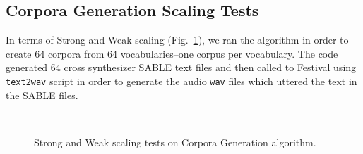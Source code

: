 {\subsection{Corpora Generation Scaling Tests}
\label{CG_Scaling_test}

In terms of Strong and Weak scaling (Fig.~\ref{fig:Corpora_Scaling}), we ran the algorithm in order to create 64 corpora from 64 vocabularies--one corpus per vocabulary. The code generated 64 cross synthesizer SABLE text files and then called to Festival using \texttt{text2wav} script in order to generate the audio \texttt{wav} files which uttered the text in the SABLE files.

\begin{figure}[tb] 
    \centering
    \hfill
\\
    \hfill
	\caption{Strong and Weak scaling tests on Corpora Generation algorithm.}
  \label{fig:Corpora_Scaling} 
\end{figure}

}
